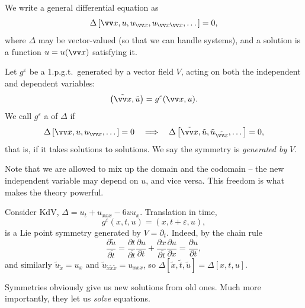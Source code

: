 We write a general differential equation as
$$
\Delta\left[\vv x, u, u_{\vv x}, u_{\vv x\vv x}, \dots\right] = 0,
$$
where $\Delta$ may be vector-valued (so that we can handle systems), and a solution is a function $u = u(\vv x)$ satisfying it.

\begin{definition}
	Let $g^\varepsilon$ be a 1.p.g.t.\ generated by a vector field $V$, acting on both the independent and dependent variables:
	$$
	\left(\tilde{\vv x}, \tilde u\right) = g^\varepsilon(\vv x, u).
	$$
	We call $g^\varepsilon$ a  of $\Delta$ if
	$$
	\Delta\left[\vv x, u, u_{\vv x},\dots\right] = 0 \quad\Longrightarrow\quad \Delta\left[\tilde{\vv x},\tilde u, \tilde u_{\tilde{\vv x}},\dots\right] = 0,
	$$
	that is, if it takes solutions to solutions. We say the symmetry is \emph{generated by} $V$.
\end{definition}

Note that we are allowed to mix up the domain and the codomain -- the new independent variable may depend on $u$, and vice versa. This freedom is what makes the theory powerful.

\begin{example}
	Consider KdV, $\Delta = u_t + u_{xxx} - 6uu_x$. Translation in time,
	$$
	g^\varepsilon(x,t,u) = (x, t+\varepsilon, u),
	$$
	is a Lie point symmetry generated by $V = \partial_t$. Indeed, by the chain rule
	$$
	\frac{\partial\tilde u}{\partial\tilde t} = \frac{\partial t}{\partial\tilde t}\frac{\partial u}{\partial t} + \frac{\partial x}{\partial\tilde t}\frac{\partial u}{\partial x} = \frac{\partial u}{\partial t},
	$$
	and similarly $\tilde u_{\tilde x} = u_x$ and $\tilde u_{\tilde x\tilde x\tilde x} = u_{xxx}$, so $\Delta[\tilde x,\tilde t,\tilde u] = \Delta[x,t,u]$.
\end{example}

Symmetries obviously give us new solutions from old ones. Much more importantly, they let us \emph{solve} equations.

